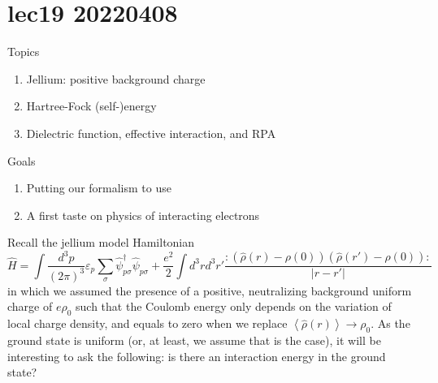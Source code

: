 \chapter{lec19 20220408}

Topics

\begin{enumerate}
    \item Jellium: positive background charge
    \item Hartree-Fock (self-)energy
    \item Dielectric function, effective interaction, and RPA
\end{enumerate}

Goals

\begin{enumerate}
    \item Putting our formalism to use
    \item A first taste on physics of interacting electrons
\end{enumerate}

Recall the jellium model Hamiltonian
\[ \hat{H}=\int{\frac{d^3p}{\left( 2\pi \right) ^3}\varepsilon _p\sum_{\sigma}{\hat{\psi}_{p\sigma}^{\dagger}\hat{\psi}_{p\sigma}}}+\frac{e^2}{2}\int{d^3rd^3r'\frac{:\left( \hat{\rho}\left( r \right) -\rho \left( 0 \right) \right) \left( \hat{\rho}\left( r' \right) -\rho \left( 0 \right) \right) :}{\left| r-r' \right|}}\]
in which we assumed the presence of a positive, neutralizing background uniform charge of $e\rho_0$ such that the Coulomb energy only depends on the variation of local charge density, and equals to zero when we replace $\left< \hat{\rho}\left( r \right) \right> \rightarrow \rho _0$. As the ground state is uniform (or, at least, we assume that is the case), it will be interesting to ask the following: is there an interaction energy in the ground state?

